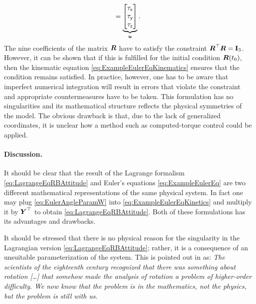 \begin{subequations}
\begin{align}
 = 
 \underbrace{\begin{bmatrix} \taux \\ \tauy \\ \tauz \end{bmatrix}}_{\sysInput}.
 \label{eq:ExampleEulerEqKinetics}
\end{align}
\end{subequations}
The nine coefficients of the matrix $\R$ have to satisfy the constraint $\R^\top \R = \idMat[3]$.
However, it can be shown that if this is fulfilled for the initial condition $\R(t_0)$, then the kinematic equation \eqref{eq:ExampleEulerEqKinematics} ensures that the condition remains satisfied.
In practice, however, one has to be aware that imperfect numerical integration will result in errors that violate the constraint and appropriate countermeasures have to be taken.
This formulation has no singularities and its mathematical structure reflects the physical symmetries of the model.
The obvious drawback is that, due to the lack of generalized coordinates, it is unclear how a method such as computed-torque control could be applied.

\paragraph{Discussion.}
It should be clear that the result of the Lagrange formalism \eqref{eq:LagrangeEqRBAttitude} and Euler's equations \eqref{eq:ExampleEulerEq} are two different mathematical representations of the same physical system.
In fact one may plug \eqref{eq:EulerAngleParamW} into \eqref{eq:ExampleEulerEqKinetics} and multiply it by $\kinBasisMat^\top$ to obtain \eqref{eq:LagrangeEqRBAttitude}.
Both of these formulations has its advantages and drawbacks.

It should be stressed that there is no physical reason for the singularity in the Lagrangian version \eqref{eq:LagrangeEqRBAttitude}; rather, it is a consequence of an unsuitable parameterization of the system.
This is pointed out in \cite[sec.\ 1.1.1]{Schwertassek:MultibodySystems} as:
\textit{
The scientists of the eighteenth century recognized that there was something about rotation [\ldots] that somehow made the analysis of rotation a problem of higher-order difficulty.
We now know that the problem is in the mathematics, not the physics, but the problem is still with us.
}

